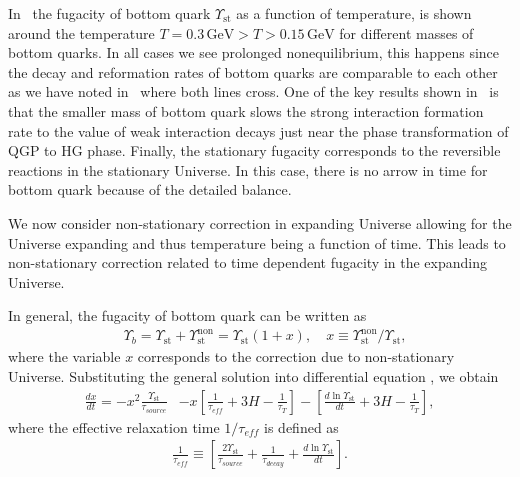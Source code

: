 In~ the fugacity of bottom quark $\Upsilon_{\mathrm{st}}$ as a function of temperature,  is shown around the temperature $T=0.3\,\mathrm{GeV}>T>0.15\,\mathrm{GeV}$ for different masses of bottom quarks. In all cases we see prolonged nonequilibrium, this happens since the decay and reformation rates of bottom quarks are comparable to each other as we have noted in~ where both lines cross. One of the key results shown in~ is that the smaller mass of bottom quark slows the strong interaction formation rate to the value of weak interaction decays just near the phase transformation of QGP to HG phase. Finally, the stationary fugacity corresponds to the reversible reactions in the stationary Universe. In this case, there is no arrow in time for bottom quark because of the detailed balance.

We now consider non-stationary correction in expanding Universe allowing for the Universe expanding and thus temperature being a function of time. This leads to non-stationary correction related to time dependent fugacity in the expanding Universe. 

In general, the fugacity of bottom quark can be written as 
\begin{align}\label{Nonstationary_sol}
&\Upsilon_b=\Upsilon_{\mathrm{st}}+\Upsilon^{\mathrm{non}}_{\mathrm{st}}=\Upsilon_\mathrm{st}\left(1+x\right),\quad x\equiv{\Upsilon_\mathrm{st}^{\mathrm{non}}}/{\Upsilon_\mathrm{st}},
\end{align}
where the variable $x$ corresponds to the correction due to non-stationary Universe. Substituting the general solution  into differential equation , we obtain
\begin{align}\label{Nonstationary_eq}
\frac{dx}{dt}=-x^2\frac{\Upsilon_\mathrm{st}}{\tau_{source}}&-x\left[\frac{1}{\tau_{eff}}+3H-\frac{1}{\tau_T}\right]-\left[\frac{d\ln\Upsilon_\mathrm{st}}{dt}+3H-\frac{1}{\tau_T}\right],
\end{align}
where the effective relaxation time $1/\tau_{eff}$ is defined as
\begin{align}
\frac{1}{\tau_{eff}}\equiv\left[\frac{2\Upsilon_\mathrm{st}}{\tau_{source}}+\frac{1}{\tau_{decay}}+\frac{d\ln\Upsilon_\mathrm{st}}{dt}\right].
\end{align}

